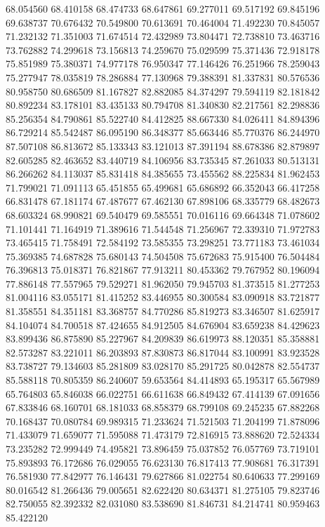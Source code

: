 68.054560
68.410158
68.474733
68.647861
69.277011
69.517192
69.845196
69.638737
70.676432
70.549800
70.613691
70.464004
71.492230
70.845057
71.232132
71.351003
71.674514
72.432989
73.804471
72.738810
73.463716
73.762882
74.299618
73.156813
74.259670
75.029599
75.371436
72.918178
75.851989
75.380371
74.977178
76.950347
77.146426
76.251966
78.259043
75.277947
78.035819
78.286884
77.130968
79.388391
81.337831
80.576536
80.958750
80.686509
81.167827
82.882085
84.374297
79.594119
82.181842
80.892234
83.178101
83.435133
80.794708
81.340830
82.217561
82.298836
85.256354
84.790861
85.522740
84.412825
88.667330
84.026411
84.894396
86.729214
85.542487
86.095190
86.348377
85.663446
85.770376
86.244970
87.507108
86.813672
85.133343
83.121013
87.391194
88.678386
82.879897
82.605285
82.463652
83.440719
84.106956
83.735345
87.261033
80.513131
86.266262
84.113037
85.831418
84.385655
73.455562
88.225834
81.962453
71.799021
71.091113
65.451855
65.499681
65.686892
66.352043
66.417258
66.831478
67.181174
67.487677
67.462130
67.898106
68.335779
68.482673
68.603324
68.990821
69.540479
69.585551
70.016116
69.664348
71.078602
71.101441
71.164919
71.389616
71.544548
71.256967
72.339310
71.972783
73.465415
71.758491
72.584192
73.585355
73.298251
73.771183
73.461034
75.369385
74.687828
75.680143
74.504508
75.672683
75.915400
76.504484
76.396813
75.018371
76.821867
77.913211
80.453362
79.767952
80.196094
77.886148
77.557965
79.529271
81.962050
79.945703
81.373515
81.277253
81.004116
83.055171
81.415252
83.446955
80.300584
83.090918
83.721877
81.358551
84.351181
83.368757
84.770286
85.819273
83.346507
81.625917
84.104074
84.700518
87.424655
84.912505
84.676904
83.659238
84.429623
83.899436
86.875890
85.227967
84.209839
86.619973
88.120351
85.358881
82.573287
83.221011
86.203893
87.830873
86.817044
83.100991
83.923528
83.738727
79.134603
85.281809
83.028170
85.291725
80.042878
82.554737
85.588118
70.805359
86.240607
59.653564
84.414893
65.195317
65.567989
65.764803
65.846038
66.022751
66.611638
66.849432
67.414139
67.091656
67.833846
68.160701
68.181033
68.858379
68.799108
69.245235
67.882268
70.168437
70.080784
69.989315
71.233624
71.521503
71.204199
71.878096
71.433079
71.659077
71.595088
71.473179
72.816915
73.888620
72.524334
73.235282
72.999449
74.495821
73.896459
75.037852
76.057769
73.719101
75.893893
76.172686
76.029055
76.623130
76.817413
77.908681
76.317391
76.581930
77.842977
76.146431
79.627866
81.022754
80.640633
77.299169
80.016542
81.266436
79.005651
82.622420
80.634371
81.275105
79.823746
82.750055
82.392332
82.031080
83.538690
81.846731
84.214741
80.959463
85.422120

